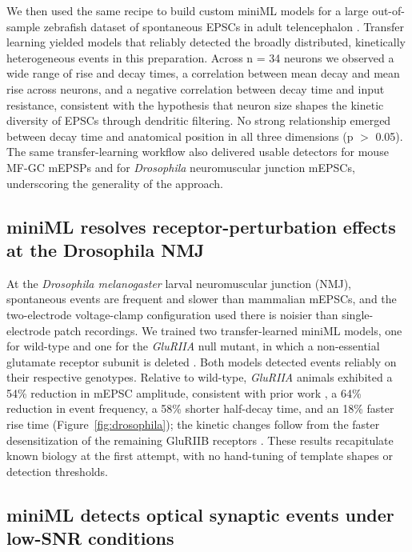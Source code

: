\documentclass[11pt]{article}
\begin{document}
We then used the same recipe to build custom miniML models for a large
out-of-sample zebrafish dataset of spontaneous EPSCs in adult telencephalon
\citep{rupprecht2018zebrafish}. Transfer learning yielded models that
reliably detected the broadly distributed, kinetically heterogeneous events
in this preparation. Across n = 34 neurons we observed a wide range of rise
and decay times, a correlation between mean decay and mean rise across
neurons, and a negative correlation between decay time and input resistance,
consistent with the hypothesis that neuron size shapes the kinetic
diversity of EPSCs through dendritic filtering. No strong relationship
emerged between decay time and anatomical position in all three dimensions
(p $>$ 0.05). The same transfer-learning workflow also delivered usable
detectors for mouse MF-GC mEPSPs and for \textit{Drosophila} neuromuscular
junction mEPSCs, underscoring the generality of the approach.

\subsection{miniML resolves receptor-perturbation effects at the Drosophila NMJ}

At the \textit{Drosophila melanogaster} larval neuromuscular junction (NMJ),
spontaneous events are frequent and slower than mammalian mEPSCs, and the
two-electrode voltage-clamp configuration used there \citep{baccinocalace2022thin}
is noisier than single-electrode patch recordings. We trained two
transfer-learned miniML models, one for wild-type and one for the
\textit{GluRIIA} null mutant, in which a non-essential glutamate receptor
subunit is deleted \citep{petersen1997retrograde, diantonio1999glurii}. Both
models detected events reliably on their respective genotypes. Relative to
wild-type, \textit{GluRIIA} animals exhibited a 54\% reduction in mEPSC
amplitude, consistent with prior work
\citep{diantonio1999glurii, petersen1997retrograde}, a 64\% reduction in
event frequency, a 58\% shorter half-decay time, and an 18\% faster rise
time (Figure~\ref{fig:drosophila}); the kinetic changes follow from the
faster desensitization of the remaining GluRIIB receptors
\citep{diantonio1999glurii}. These results recapitulate known biology at the
first attempt, with no hand-tuning of template shapes or detection
thresholds.

\subsection{miniML detects optical synaptic events under low-SNR conditions}
\end{document}

